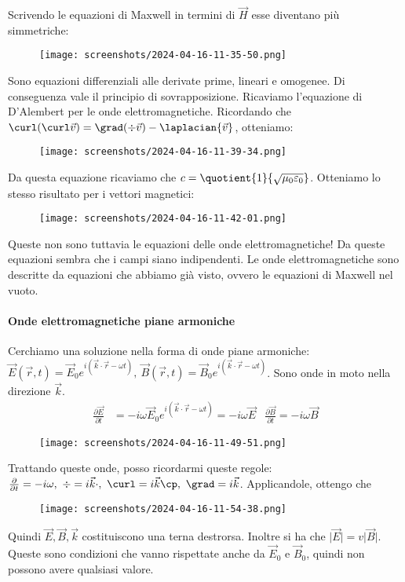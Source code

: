 Scrivendo le equazioni di Maxwell in termini di \(\vec{H}\) esse diventano più simmetriche:
\begin{figure}[H]
	\centering
	\texttt{[image: screenshots/2024-04-16-11-35-50.png]}
\end{figure}
Sono equazioni differenziali alle derivate prime, lineari e omogenee. Di conseguenza vale il principio di sovrapposizione. Ricaviamo l'equazione di D'Alembert per le onde elettromagnetiche. Ricordando che \(\curl (\curl \vec{v}) = \grad(\div \vec{v})- \laplacian{\vec{v}} \), otteniamo:
\begin{figure}[H]
	\centering
	\texttt{[image: screenshots/2024-04-16-11-39-34.png]}
\end{figure}
Da questa equazione ricaviamo che \(c=\quotient{1}{\sqrt{\mu _0 \varepsilon _0} } \). Otteniamo lo stesso risultato per i vettori magnetici:
\begin{figure}[H]
	\centering
	\texttt{[image: screenshots/2024-04-16-11-42-01.png]}
\end{figure}
Queste non sono tuttavia le equazioni delle onde elettromagnetiche! Da queste equazioni sembra che i campi siano indipendenti. Le onde elettromagnetiche sono descritte da equazioni che abbiamo già visto, ovvero le equazioni di Maxwell nel vuoto.

\paragraph{Onde elettromagnetiche piane armoniche}
Cerchiamo una soluzione nella forma di onde piane armoniche: \(\vec{E}(\vec{r},t)=\vec{E}_0 e^{i(\vec{k}\cdot \vec{r}- \omega t)},\ \vec{B}(\vec{r},t)=\vec{B}_{0} e^{i(\vec{k}\cdot \vec{r}-\omega t)}\). Sono onde in moto nella direzione \(\vec{k}\).
\begin{align}
	\frac{\partial \vec{E}}{\partial t}&= -i \omega \vec{E}_0 e^{i(\vec{k}\cdot \vec{r}-\omega t)}=-i \omega \vec{E} & \frac{\partial \vec{B}}{\partial t}=-i \omega \vec{B}  
\end{align}
\begin{figure}[H]
	\centering
	\texttt{[image: screenshots/2024-04-16-11-49-51.png]}
\end{figure}
Trattando queste onde, posso ricordarmi queste regole: \(\frac{\partial }{\partial t} = -i \omega,\ \div = i \vec{k}\cdot,\ \curl = i \vec{k} \cp,\ \grad = i \vec{k}\). Applicandole, ottengo che
\begin{figure}[H]
	\centering
	\texttt{[image: screenshots/2024-04-16-11-54-38.png]}
\end{figure}
Quindi \(\vec{E},\vec{B},\vec{k}\) costituiscono una terna destrorsa. Inoltre si ha che \(\vert \vec{E} \vert =v \vert \vec{B} \vert \). Queste sono condizioni che vanno rispettate anche da \(\vec{E}_0\) e \(\vec{B}_0\), quindi non possono avere qualsiasi valore.

